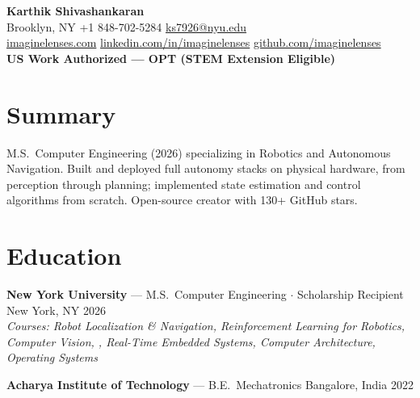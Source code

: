 \documentclass[11pt]{article}
\begin{document}
\begin{center}
  {\LARGE\textbf{Karthik Shivashankaran}} \\[2pt]
  {\small
    Brooklyn, NY \textbar{}
    +1 848-702-5284  \textbar{}
    \href{mailto:ks7926@nyu.edu}{ks7926@nyu.edu} \\
    \href{https://imaginelenses.com/}{imaginelenses.com} \textbar{}
    \href{https://www.linkedin.com/in/imaginelenses}{linkedin.com/in/imaginelenses} \textbar{}
    \href{https://github.com/imaginelenses}{github.com/imaginelenses}
  } \\[1pt]
  {\small\textbf{US Work Authorized --- OPT (STEM Extension Eligible)}}
\end{center}

\vspace{-4pt}

\section*{Summary}
M.S.\ Computer Engineering (2026) specializing in Robotics and Autonomous Navigation. Built and deployed full autonomy stacks on physical hardware, from perception through planning; implemented state estimation and control algorithms from scratch. Open-source creator with 130+ GitHub stars.

\section*{Education}
\textbf{New York University} --- M.S.\ Computer Engineering $\cdot$ Scholarship Recipient
\hfill New York, NY \textbar{} 2026 \\
{\small\textit{Courses: Robot Localization \& Navigation, Reinforcement Learning for Robotics, Computer Vision, , Real-Time Embedded Systems, Computer Architecture, Operating Systems}}

\smallskip
\textbf{Acharya Institute of Technology} --- B.E.\ Mechatronics
\hfill Bangalore, India \textbar{} 2022

\end{document}
